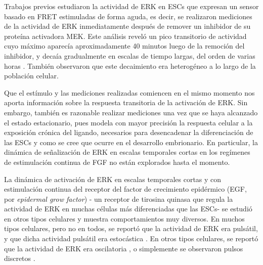 \documentclass[./main.tex]{subfiles}
\begin{document}
Trabajos previos estudiaron la actividad de ERK en ESCs que expresan un sensor basado en FRET estimuladas de forma aguda, es decir, se realizaron mediciones de la actividad de ERK inmediatamente después de remover un inhibidor de su proteína activadora MEK. Este análisis reveló un pico transitorio de actividad cuyo máximo aparecía aproximadamente 40 minutos luego de la remoción del inhibidor, y decaía gradualmente en escalas de tiempo largas, del orden de varias horas \cite{Deathridge2019}. También observaron que este decaimiento era heterogéneo a lo largo de la población celular. 

Que el estímulo y las mediciones realizadas comiencen en el mismo momento nos aporta información sobre la respuesta transitoria de la activación de ERK. Sin embargo, también es razonable realizar mediciones una vez que se haya alcanzado el estado estacionario, pues modela con mayor precisión la respuesta celular a la exposición crónica del ligando, necesarios para desencadenar la diferenciación de las ESCs y como se cree que ocurre en el desarrollo embrionario. En particular, la dinámica de señalización de ERK en escalas temporales cortas en los regímenes de estimulación continua de FGF no están explorados hasta el momento. 


La dinámica de activación de ERK en escalas temporales cortas y con estimulación continua del receptor del factor de crecimiento epidérmico (EGF, por \textit{epidermal grow factor}) - un receptor de tirosina quinasa que regula la actividad de ERK en muchas células más diferenciadas que las ESCs- se estudió en otros tipos celulares y muestra comportamientos muy diversos. En muchos tipos celulares, pero no en todos, se reportó que la actividad de ERK era pulsátil, y que dicha actividad pulsátil era estocástica \cite{Aoki2013}. En otros tipos celulares, se reportó que la actividad de ERK era oscilatoria \cite{Shankaran2009}, o simplemente se observaron pulsos discretos \cite{Albeck2013}.


\end{document}
